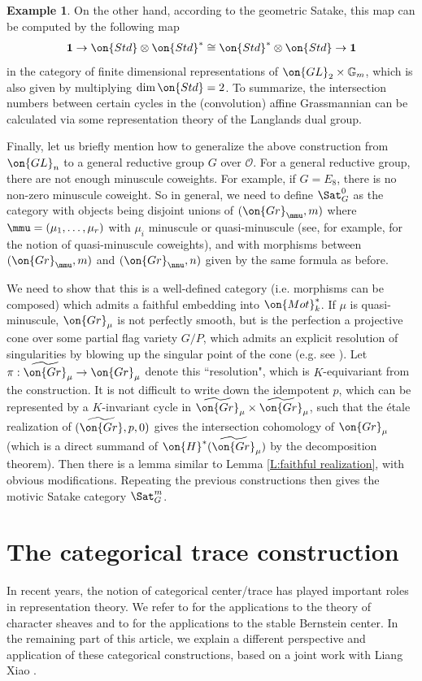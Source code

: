 \documentclass[11pt]{amsart}
\theoremstyle{definition}
\theoremstyle{definition}
\newtheorem{ex}[thm]{Example}
\theoremstyle{definition}
\numberwithin{equation}{subsection}
\newcommand{\bG}{{\mathbb G}}
\newcommand{\mO}{{\mathcal O}}
\newcommand{\Gr}{{\on{Gr}}}
\newcommand{\GL}{{\on{GL}}}
\newcommand{\wGr}{{\widetilde{\Gr}}}
\begin{document}
\begin{ex}
On the other hand, according to the geometric Satake, this map can be computed by the following map 
\[\mathbf{1}\to \on{Std}\otimes \on{Std}^*\cong \on{Std}^*\otimes \on{Std} \to \mathbf{1}\]
in the category of finite dimensional representations of $\GL_2\times \bG_m$, which is also given by multiplying $\dim \on{Std}=2$. To summarize, the intersection numbers between certain cycles in the (convolution) affine Grassmannian can be calculated via some representation theory of the Langlands dual group. 
\end{ex}


Finally, let us briefly mention how to generalize the above construction from $\GL_n$ to a general reductive group $G$ over $\mO$. For a general reductive group, there are not enough minuscule coweights. For example, if $G=E_8$, there is no non-zero minuscule coweight.
So in general, we need to define $\Sat^0_G$ as the category with objects being disjoint unions of $(\Gr_{\mmu},m)$ where $\mmu=(\mu_1,\ldots,\mu_r)$ with $\mu_i$ minuscule or quasi-minuscule (see, for example, \cite[\S 2.2.2]{Zh1} for the notion of quasi-minuscule coweights), and with morphisms between $(\Gr_{\mmu},m)$ and $(\Gr_{\nnu},n)$ given by the same formula as before. 

We need to show that this is a well-defined category (i.e. morphisms can be composed) which admits a faithful embedding into $\on{Mot}_k^*$.
If $\mu$ is quasi-minuscule, $\Gr_\mu$ is not perfectly smooth, but is the perfection a projective cone over some partial flag variety $G/P$, which admits an explicit resolution of singularities by blowing up the singular point of the cone (e.g. see \cite[Lemma 2.12]{Zh1}). Let $\pi:\wGr_\mu\to \Gr_\mu$ denote this ``resolution", which is $K$-equivariant from the construction. It is not difficult to write down the idempotent $p$, which can be represented by a $K$-invariant cycle in $\wGr_\mu\times\wGr_\mu$, such that the \'etale realization of $(\wGr,p,0)$ gives the intersection cohomology of $\Gr_\mu$ (which is a direct summand of $\on{H}^*(\wGr_\mu)$ by the decomposition theorem). 
 Then there is a lemma similar to Lemma \ref{L:faithful realization}, with obvious modifications. Repeating the previous constructions then gives the motivic Satake category $\Sat^m_G$.

\section{The categorical trace construction}
In recent years, the notion of categorical center/trace has played important roles in representation theory. 
We refer to \cite{BN,BFO,Lu3,Lu4,Lu5,Lu6} for the applications to the theory of character sheaves and to \cite{BKV} for the applications to the stable Bernstein center. In the remaining part of this article, we explain a different perspective and application of these categorical constructions, based on a joint work with Liang Xiao \cite{XZ}.
\end{document}
